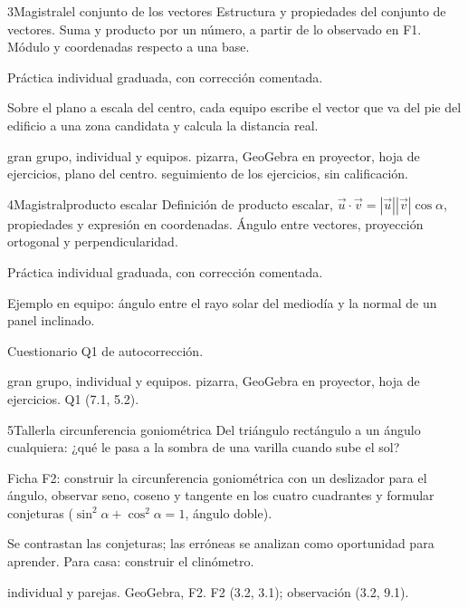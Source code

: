 \begin{sesionbox}{3}{Magistral}{el conjunto de los vectores}
 Estructura y propiedades del conjunto de vectores. Suma y producto por un número, a partir de lo observado en F1. Módulo y coordenadas respecto a una base.

 Práctica individual graduada, con corrección comentada.

 Sobre el plano a escala del centro, cada equipo escribe el vector que va del pie del edificio a una zona candidata y calcula la distancia real.

 gran grupo, individual y equipos.  pizarra, GeoGebra en proyector, hoja de ejercicios, plano del centro.  seguimiento de los ejercicios, sin calificación.
\end{sesionbox}

\begin{sesionbox}{4}{Magistral}{producto escalar}
 Definición de producto escalar, $\vec u\cdot\vec v=|\vec u||\vec v|\cos\alpha$, propiedades y expresión en coordenadas. Ángulo entre vectores, proyección ortogonal y perpendicularidad.

 Práctica individual graduada, con corrección comentada.

 Ejemplo en equipo: ángulo entre el rayo solar del mediodía y la normal de un panel inclinado.

 Cuestionario Q1 de autocorrección.

 gran grupo, individual y equipos.  pizarra, GeoGebra en proyector, hoja de ejercicios.  Q1 (7.1, 5.2).
\end{sesionbox}

\begin{sesionbox}{5}{Taller}{la circunferencia goniométrica}
 Del triángulo rectángulo a un ángulo cualquiera: ¿qué le pasa a la sombra de una varilla cuando sube el sol?

 Ficha F2: construir la circunferencia goniométrica con un deslizador para el ángulo, observar seno, coseno y tangente en los cuatro cuadrantes y formular conjeturas ($\sin^2\alpha+\cos^2\alpha=1$, ángulo doble).

 Se contrastan las conjeturas; las erróneas se analizan como oportunidad para aprender. Para casa: construir el clinómetro.

 individual y parejas.  GeoGebra, F2.  F2 (3.2, 3.1); observación (3.2, 9.1).
\end{sesionbox}

